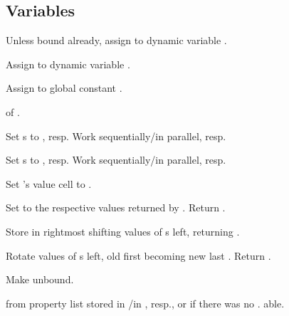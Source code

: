 \subsection{Variables}

\begin{LIST}{1cm}

  Unless bound already, assign  to dynamic variable
  . 

  Assign  to dynamic variable .

  Assign  to global constant .

   of .

  Set s to , resp. Work sequentially/in
  parallel, resp. 

  Set s to , resp. Work sequentially/in
  parallel, resp. 

  Set 's value cell to .

  Set  to the respective values returned by
  . Return .

   Store  in
  rightmost  shifting values of s left, returning
  .

   Rotate values of s left,
  old first becoming new last . Return \retval{\NIL}.

  Make  unbound.

  \label{:property_lists}
   from property list stored in
  /in , resp., or  if
  there was no . able.


\end{LIST}
